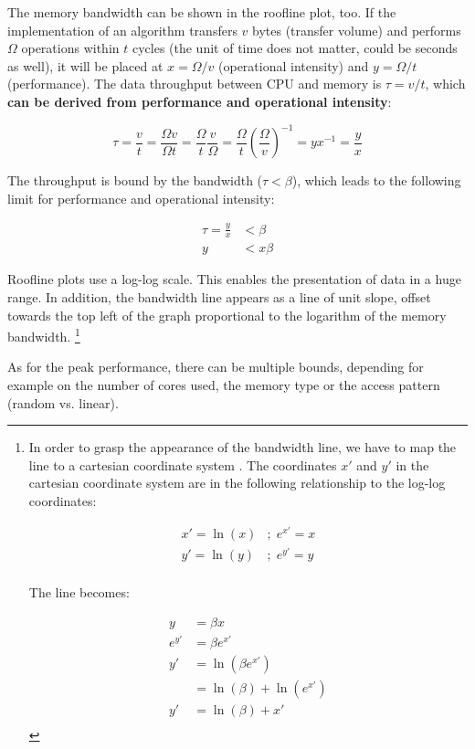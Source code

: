 \documentclass[a4paper,12pt]{report}
\begin{document}
The memory bandwidth can be shown in the roofline plot, too. If the
implementation of an algorithm transfers $v$ bytes (transfer volume) and
performs $\Omega$ operations within $t$ cycles (the unit of time does not
matter, could be seconds as well), it will be placed at $x=\Omega/v$
(operational intensity) and $y=\Omega/t$ (performance). The data throughput
between CPU and memory is $\tau=v/t$, which {\bf can be derived from performance
and operational intensity}:

$$
\tau=\frac{v}{t}
=\frac{\Omega v}{\Omega t}
=\frac{\Omega}{t}\frac{v}{\Omega}
=\frac{\Omega}{t}(\frac{\Omega}{v})^{-1}
=yx^{-1}
=\frac{y}{x}
$$

The throughput is bound by the bandwidth ($\tau<\beta$), which leads to the
following limit for performance and operational intensity:

\begin{align*}
\tau=\frac{y}{x}&<\beta\\
y&<x\beta 
\end{align*}

Roofline plots use a log-log scale. This enables the presentation of data in a
huge range. In addition, the bandwidth line appears as a line of unit slope,
offset towards the top left of the graph proportional to the logarithm of the
memory bandwidth.
\footnote{ In order to grasp the appearance of the bandwidth line, we have to
map the line to a cartesian coordinate system .
The coordinates $x'$ and $y'$ in the cartesian coordinate system are in the
following relationship to the log-log coordinates:

\begin{align*}
x'=\ln(x)&;\; e^{x'}=x\\
y'=\ln(y)&;\; e^{y'}=y\\
\end{align*}

The line becomes:

\begin{align*}
y&=\beta x\\
e^{y'}&=\beta e^{x'}\\
y'&=\ln(\beta e^{x'})\\
&=\ln(\beta) + \ln(e^{x'})\\
y'&=\ln(\beta) + x'\\
\end{align*}
}

As for the peak performance, there can be multiple bounds, depending for example
on the number of cores used, the memory type or the access pattern (random vs.
linear).
\end{document}
